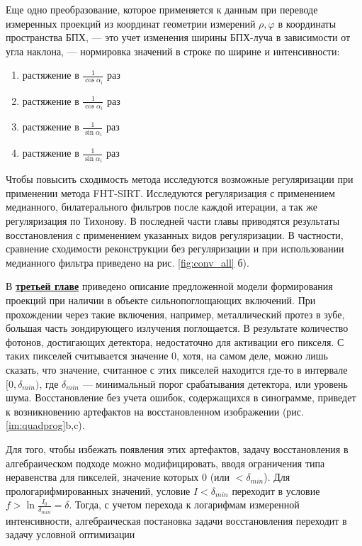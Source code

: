 \vspace{2cm}

Еще одно преобразование, которое применяется к данным при переводе измеренных проекций из координат геометрии измерений $\rho, \varphi$ в координаты пространства БПХ, --- это учет изменения ширины БПХ-луча в зависимости от угла наклона, --- нормировка значений в строке по ширине и интенсивности:
\begin{enumerate}[label=\Roman*.]
	\item растяжение в $\frac 1 {\cos \alpha_i}$ раз
	\item растяжение в $\frac 1 {\cos \alpha_i}$ раз
	\item растяжение в $\frac 1 {\sin \alpha_i}$ раз
	\item растяжение в $\frac 1 {\sin \alpha_i}$ раз
\end{enumerate}

Чтобы повысить сходимость метода исследуются возможные регуляризации при применении метода FHT-SIRT.
Исследуются регуляризация с применением медианного, билатерального фильтров после каждой итерации, а так же регуляризация по Тихонову.
В последней части главы приводятся результаты восстановления с применением указанных видов регуляризации.
В частности, сравнение сходимости реконструкции без регуляризации и при использовании медианного фильтра приведено на рис. \ref{fig:conv_all} б).

\vspace{5mm}

В \underline{\textbf{третьей главе}} приведено описание предложенной модели формирования проекций при наличии в объекте сильнопоглощающих включений.
При прохождении через такие включения, например, металлический протез в зубе, большая часть зондирующего излучения поглощается.
В результате количество фотонов, достигающих детектора, недостаточно для активации его пикселя.
С таких пикселей считывается значение 0, хотя, на самом деле, можно лишь сказать, что значение, считанное с этих пикселей находится где-то в интервале $[0, \delta_{min})$, где $\delta_{min}$ --- минимальный порог срабатывания детектора, или уровень шума.
Восстановление без учета ошибок, содержащихся в синограмме, приведет к возникновению артефактов на восстановленном изображении (рис. \ref{im:quadprog}b,c). 

Для того, чтобы избежать появления этих артефактов, задачу восстановления в алгебраическом подходе можно модифицировать, вводя ограничения типа неравенства для пикселей, значение которых 0 (или $<  \delta_{min}$).
Для прологарифмированных значений, условие $I < \delta_{min}$ переходит в условие $f > \ln\frac{I_0}{\delta_{min}} = \delta$.
Тогда, с учетом перехода к логарифмам измеренной интенсивности, алгебраическая постановка задачи восстановления переходит в задачу условной оптимизации 

